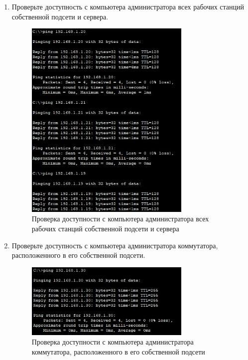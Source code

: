 \documentclass[bachelor, och, labwork]{shiza}
\begin{document}
\begin{enumerate}
    \item Проверьте доступность с компьютера администратора всех рабочих станций собственной подсети и сервера.
    
    \begin{figure}[H]
        \centering      %
        \includegraphics[width=0.75\textwidth]{3}
        \caption{Проверка доступности с компьютера администратора всех рабочих станций собственной подсети и сервера}
        \label{fig:image1}
    \end{figure}

    \item Проверьте доступность с компьютера администратора коммутатора, расположенного в его собственной подсети.
    
    \begin{figure}[H]
        \centering      %
        \includegraphics[width=0.75\textwidth]{4}
        \caption{Проверка доступности с компьютера администратора коммутатора, расположенного в его собственной подсети}
        \label{fig:image1}
    \end{figure}


\end{enumerate}
\end{document}

